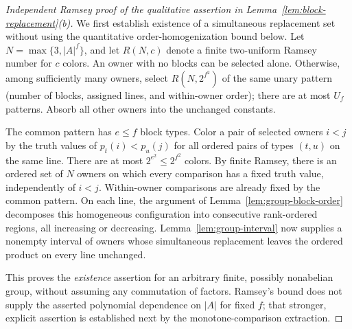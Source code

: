 \begin{proof}[Independent Ramsey proof of the qualitative assertion in Lemma~\ref{lem:block-replacement}(b)]
We first establish existence of a simultaneous replacement set without
using the quantitative order-homogenization bound below.  Let
$N=\max\{3,|A|^f\}$, and let $R(N,c)$ denote a finite two-uniform
Ramsey number for $c$ colors.  An owner with no blocks can be selected
alone.  Otherwise, among sufficiently many owners, select
$R(N,2^{f^2})$ of the same unary pattern (number of blocks, assigned
lines, and within-owner order); there are at most $U_f$ patterns.
Absorb all other owners into the unchanged constants.

The common pattern has $e\le f$ block types.  Color a pair of selected
owners $i<j$ by the truth values of
$p_t(i)<p_u(j)$ for all ordered pairs of types $(t,u)$ on the same
line.  There are at most $2^{e^2}\le2^{f^2}$ colors.  By finite Ramsey,
there is an ordered set of $N$ owners on which every comparison has a
fixed truth value, independently of $i<j$.  Within-owner comparisons
are already fixed by the common pattern.  On each line, the argument
of Lemma~\ref{lem:group-block-order} decomposes this homogeneous
configuration into consecutive rank-ordered regions, all increasing
or decreasing.  Lemma~\ref{lem:group-interval} now supplies a nonempty
interval of owners whose simultaneous replacement leaves the ordered
product on every line unchanged.

This proves the \emph{existence} assertion for an arbitrary finite,
possibly nonabelian group, without assuming any commutation of factors.
Ramsey's bound does not supply the asserted polynomial dependence on
$|A|$ for fixed $f$; that stronger, explicit assertion is established
next by the monotone-comparison extraction.
\end{proof}

